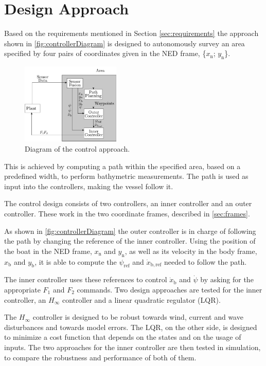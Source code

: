 \chapter{Design Approach} \label{chap:designaproach}
Based on the requirements mentioned in Section \ref{sec:requirements} the approach shown in \autoref{fig:controllerDiagram} is designed to autonomously survey an area specified by four pairs of coordinates given in the NED frame, \{$x_\mathrm{n}$; $y_\mathrm{n}$\}.
\begin{figure}[H]
    \includegraphics[width=0.42\textwidth]{figures/controllerDiagram2}
    \caption{Diagram of the control approach.}
    \label{fig:controllerDiagram}
\end{figure}

This is achieved by computing a path within the specified area, based on a predefined width, to perform bathymetric measurements. The path is used as input into the controllers, making the vessel follow it. 

The control design consists of two controllers, an inner controller and an outer controller. These work in the two coordinate frames, described in \autoref{sec:frames}.

As shown in \autoref{fig:controllerDiagram} the outer controller is in charge of following the path by changing the reference of the inner controller. Using the position of the boat in the NED frame, $x_\mathrm{n}$ and $y_\mathrm{n}$, as well as its velocity in the body frame, $x_\mathrm{b}$ and $y_\mathrm{b}$, it is able to compute the $\psi_\mathrm{ref}$ and $\dot{x}_\mathrm{b,ref}$ needed to follow the path. 

The inner controller uses these references to control $\dot{x}_\mathrm{b}$ and $\dot{\psi}$ by asking for the appropriate $F_1$ and $F_2$ commands. Two design approaches are tested for the inner controller, an $H_{\infty}$ controller and a linear quadratic regulator (LQR).

The $H_{\infty}$ controller is designed to be robust towards wind, current and wave disturbances and towards model errors. The LQR, on the other side, is designed to minimize a cost function that depends on the states and on the usage of inputs. The two approaches for the inner controller are then tested in simulation, to compare the robustness and performance of both of them.

